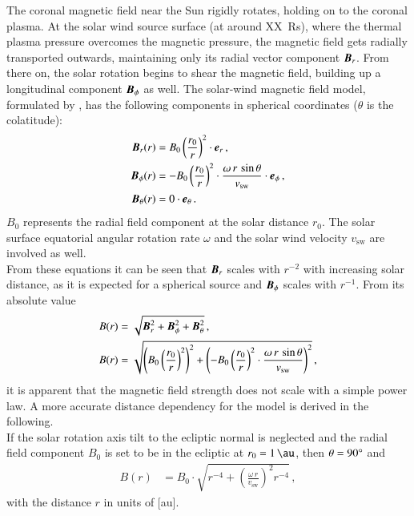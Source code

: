The coronal magnetic field near the Sun rigidly rotates, holding on to the coronal plasma. At the solar wind source surface (at around XX~Rs), where the thermal plasma pressure overcomes the magnetic pressure, the magnetic field gets radially transported outwards, maintaining only its radial vector component $\boldsymbol{B}_r$. From there on, the solar rotation begins to shear the magnetic field, building up a longitudinal component $\boldsymbol{B}_\phi$ as well. The solar-wind magnetic field model, formulated by \citet{Parker1958}, has the following components in spherical coordinates ($\theta$ is the colatitude):
\begin{align}
	\boldsymbol{B}_r(r) &= B_0 \left(\frac{r_0}{r}\right)^2 \cdot \boldsymbol{e}_r\,,\\
	\boldsymbol{B}_\phi(r) &= -B_0 \left(\frac{r_0}{r}\right)^2 \cdot \frac{\omega\,r\,\sin\theta}{v_\text{sw}} \cdot \boldsymbol{e}_\phi\,,\\
	\boldsymbol{B}_\theta(r) &= 0 \cdot \boldsymbol{e}_\theta\,.
\end{align}
$B_0$ represents the radial field component at the solar distance $r_0$. The solar surface equatorial angular rotation rate $\omega$ and the solar wind velocity $v_\text{sw}$ are involved as well.\\

From these equations it can be seen that $\boldsymbol{B}_r$ scales with $r^{-2}$ with increasing solar distance, as it is expected for a spherical source and $\boldsymbol{B}_\phi$ scales with $r^{-1}$. From its absolute value
\begin{align}
	B(r) &= \sqrt{\boldsymbol{B}_r^2 + \boldsymbol{B}_\phi^2 + \boldsymbol{B}_\theta^2}\,,\\
	B(r) &= \sqrt{\left(B_0 \left(\frac{r_0}{r}\right)^2\right)^2 + \left(-B_0 \left(\frac{r_0}{r}\right)^2 \cdot \frac{\omega\,r\,\sin\theta}{v_\text{sw}}\right)^2}\,,
\end{align}
it is apparent that the magnetic field strength does not scale with a simple power law. A more accurate distance dependency for the model is derived in the following.\\

If the solar rotation axis tilt to the ecliptic normal is neglected and the radial field component $B_0$ is set to be in the ecliptic at $r_0 = \SI{1}{\au}$, then $\theta = 90\degree$ and
\begin{align}
	B(r) &= B_0 \cdot \sqrt{r^{-4} + \left(\frac{\omega\,r}{v_\text{sw}}\right)^2 r^{-4}}\,,	\label{eq:B_1au}
\end{align}
with the distance $r$ in units of [au].\\

